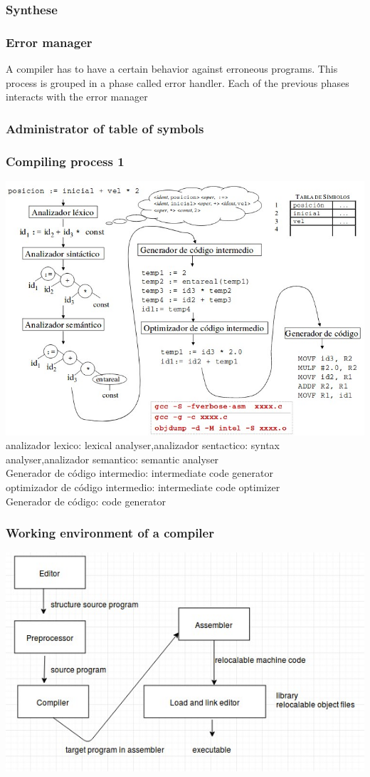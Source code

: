 \documentclass{beamer}
\begin{document}
\begin{frame}
\frametitle{Synthese}
\end{frame}
\begin{frame}
\frametitle{Error manager}
A compiler has to have a certain behavior against erroneous programs. This process is grouped in a phase called error handler. Each of the previous phases interacts with the error manager
\end{frame}
\begin{frame}
\frametitle{Administrator of table of symbols}
\end{frame}
\begin{frame}
\frametitle{Compiling process 1}
\includegraphics[scale=0.3]{5.jpg}
\\
analizador lexico: lexical analyser,analizador sentactico: syntax analyser,analizador semantico: semantic analyser\\
Generador de código intermedio: intermediate code generator\\
optimizador de código intermedio: intermediate code optimizer\\
Generador de código: code generator\\
\end{frame}
\begin{frame}
\frametitle{Working environment of a compiler}
\includegraphics[scale=0.5]{4.jpg}
\end{frame}
\end{document}
